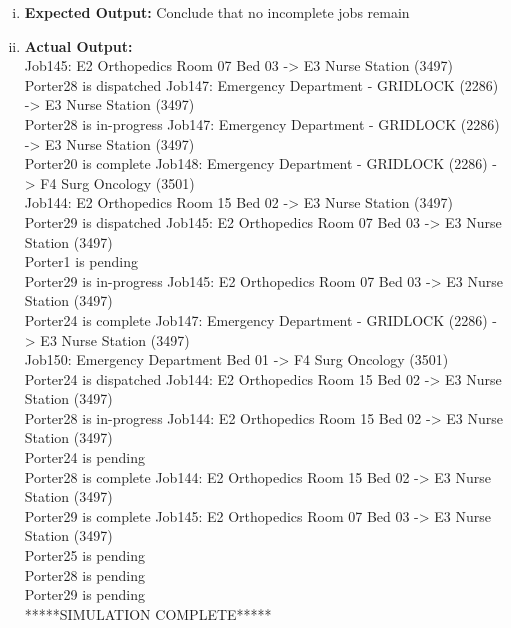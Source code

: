 \documentclass[paper=letter, fontsize=10pt]{scrartcl}
\numberwithin{equation}{section}		%
\numberwithin{figure}{section}			%
\numberwithin{table}{section}				%
\begin{document}
\begin{enumerate}[(i)]
\begin{enumerate}[(i)]
\begin{table}
\begin{center}
\begin{tabular}{| c | l | l | l | l |}
    	\end{tabular}
	\end{center}
	\end{table}
	\item \textbf{Expected Output:} Conclude that no incomplete jobs remain
	\item \textbf{Actual Output:} \\
	Job145: E2 Orthopedics Room 07 Bed 03 -> E3 Nurse Station (3497) \\
Porter28 is dispatched Job147: Emergency Department - GRIDLOCK (2286) -> E3 Nurse Station (3497) \\
Porter28 is in-progress Job147: Emergency Department - GRIDLOCK (2286) -> E3 Nurse Station (3497) \\
Porter20 is complete Job148: Emergency Department - GRIDLOCK (2286) -> F4 Surg Oncology (3501) \\
Job144: E2 Orthopedics Room 15 Bed 02 -> E3 Nurse Station (3497) \\
Porter29 is dispatched Job145: E2 Orthopedics Room 07 Bed 03 -> E3 Nurse Station (3497) \\
Porter1 is pending \\
Porter29 is in-progress Job145: E2 Orthopedics Room 07 Bed 03 -> E3 Nurse Station (3497)\\
Porter24 is complete Job147: Emergency Department - GRIDLOCK (2286) -> E3 Nurse Station (3497)\\
Job150: Emergency Department Bed 01 -> F4 Surg Oncology (3501)\\
Porter24 is dispatched Job144: E2 Orthopedics Room 15 Bed 02 -> E3 Nurse Station (3497)\\
Porter28 is in-progress Job144: E2 Orthopedics Room 15 Bed 02 -> E3 Nurse Station (3497)\\
Porter24 is pending\\
Porter28 is complete Job144: E2 Orthopedics Room 15 Bed 02 -> E3 Nurse Station (3497)\\
Porter29 is complete Job145: E2 Orthopedics Room 07 Bed 03 -> E3 Nurse Station (3497)\\
Porter25 is pending\\
Porter28 is pending\\
Porter29 is pending\\
*****SIMULATION COMPLETE*****\\
\end{enumerate}


\end{enumerate}
\end{document}
